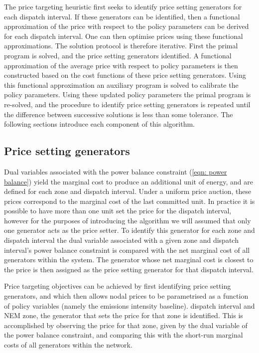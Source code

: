 \documentclass{article}
\begin{document}
The price targeting heuristic first seeks to identify price setting generators for each dispatch interval. If these generators can be identified, then a functional approximation of the price with respect to the policy parameters can be derived for each dispatch interval. One can then optimise prices using these functional approximations. The solution protocol is therefore iterative. First the primal program is solved, and the price setting generators identified. A functional approximation of the average price with respect to policy parameters is then constructed based on the cost functions of these price setting generators. Using this functional approximation an auxiliary program is solved to calibrate the policy parameters. Using these updated policy parameters the primal program is re-solved, and the procedure to identify price setting generators is repeated until the difference between successive solutions is less than some tolerance. The following sections introduce each component of this algorithm.

\subsection{Price setting generators}
Dual variables associated with the power balance constraint (\ref{eqn: power balance}) yield the marginal cost to produce an additional unit of energy, and are defined for each zone and dispatch interval. Under a uniform price auction, these prices correspond to the marginal cost of the last committed unit. In practice it is possible to have more than one unit set the price for the dispatch interval, however for the purposes of introducing the algorithm we will assumed that only one generator acts as the price setter. To identify this generator for each zone and dispatch interval the dual variable associated with a given zone and dispatch interval's power balance constraint is compared with the net marginal cost of all generators within the system. The generator whose net marginal cost is closest to the price is then assigned as the price setting generator for that dispatch interval. 

Price targeting objectives can be achieved by first identifying price setting generators, and which then allows nodal prices to be parametrised as a function of policy variables (namely the emissions intensity baseline). dispatch interval and NEM zone, the generator that sets the price for that zone is identified. This is accomplished by observing the price for that zone, given by the dual variable of the power balance constraint, and comparing this with the short-run marginal costs of all generators within the network. 
\end{document}

